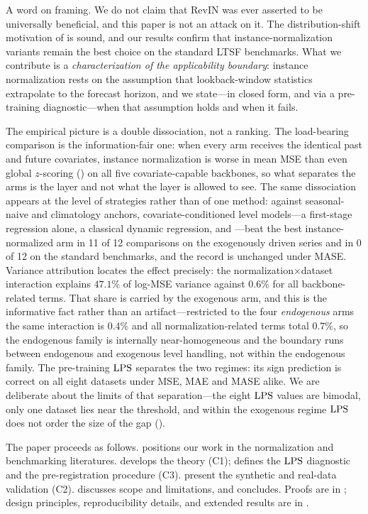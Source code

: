 A word on framing. We do not claim that RevIN was ever asserted to be universally beneficial, and this paper is not an attack on it. The distribution-shift motivation of \citet{kim2022revin} is sound, and our results confirm that instance-normalization variants remain the best choice on the standard LTSF benchmarks. What we contribute is a \emph{characterization of the applicability boundary}: instance normalization rests on the assumption that lookback-window statistics extrapolate to the forecast horizon, and we state---in closed form, and via a pre-training diagnostic---when that assumption holds and when it fails.

The empirical picture is a double dissociation, not a ranking. The load-bearing comparison is the information-fair one: when every arm receives the identical past and future covariates, instance normalization is worse in mean MSE than even global $z$-scoring (\rawm) on all five covariate-capable backbones, so what separates the arms is the layer and not what the layer is allowed to see. The same dissociation appears at the level of strategies rather than of one method: against seasonal-naive and climatology anchors, covariate-conditioned level models---a first-stage regression alone, a classical dynamic regression, and \cnm---beat the best instance-normalized arm in 11 of 12 comparisons on the exogenously driven series and in 0 of 12 on the standard benchmarks, and the record is unchanged under MASE. Variance attribution locates the effect precisely: the normalization$\times$dataset interaction explains $47.1\%$ of log-MSE variance against $0.6\%$ for all backbone-related terms. That share is carried by the exogenous arm, and this is the informative fact rather than an artifact---restricted to the four \emph{endogenous} arms the same interaction is $0.4\%$ and all normalization-related terms total $0.7\%$, so the endogenous family is internally near-homogeneous and the boundary runs between endogenous and exogenous level handling, not within the endogenous family. The pre-training $\mathrm{LPS}$ separates the two regimes: its sign prediction is correct on all eight datasets under MSE, MAE and MASE alike. We are deliberate about the limits of that separation---the eight $\mathrm{LPS}$ values are bimodal, only one dataset lies near the threshold, and within the exogenous regime $\mathrm{LPS}$ does not order the size of the gap ().

The paper proceeds as follows.  positions our work in the normalization and benchmarking literatures.  develops the theory (C1);  defines the $\mathrm{LPS}$ diagnostic and the pre-registration procedure (C3).  present the synthetic and real-data validation (C2).  discusses scope and limitations, and  concludes. Proofs are in ; design principles, reproducibility details, and extended results are in .
